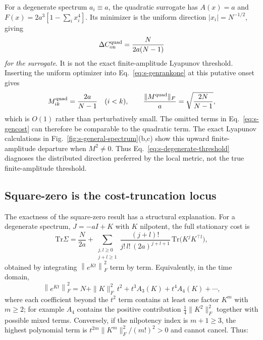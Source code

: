 \documentclass[
  aps,prl,preprint,notitlepage,superscriptaddress,nofootinbib,longbibliography,
  amsmath,amssymb
]{revtex4-2}
\newcommand{\Tr}{\mathrm{Tr}}
\newcommand{\frobnorm}[1]{\left\lVert #1\right\rVert_F}
\begin{document}
For a degenerate spectrum $a_i\equiv a$, the quadratic surrogate has
$A(x)=a$ and $F(x)=2a^3[1-\sum_i x_i^4]$.  Its minimizer is the uniform
direction $|x_i|=N^{-1/2}$, giving
\begin{equation}
\Delta C_{\rm on}^{\rm quad}=\frac{N}{2a(N-1)}
\label{eq:s-degenerate-threshold}
\end{equation}
\emph{for the surrogate}.  It is not the exact finite-amplitude Lyapunov
threshold.  Inserting the uniform optimizer into
Eq.~\eqref{eq:s-genrankone} at this putative onset gives
\begin{equation}
M_{ik}^{\rm quad}=\frac{2a}{N-1}\quad(i<k),\qquad
\frac{\|M^{\rm quad}\|_F}{a}=\sqrt{\frac{2N}{N-1}},
\label{eq:s-quad-norm}
\end{equation}
which is $O(1)$ rather than perturbatively small.  The omitted terms in
Eq.~\eqref{eq:s-gencost} can therefore be comparable to the quadratic term.
The exact Lyapunov calculations in Fig.~\ref{fig:s-general-spectrum}(b,c) show
this upward finite-amplitude departure when $M^2\neq0$.  Thus
Eq.~\eqref{eq:s-degenerate-threshold} diagnoses the distributed direction
preferred by the local metric, not the true finite-amplitude threshold.

\subsection{Square-zero is the cost-truncation locus}
\label{sec:s-truncation}

The exactness of the square-zero result has a structural explanation. For a
degenerate spectrum, $J=-aI+K$ with $K$ nilpotent, the full stationary cost is
\begin{equation}
\Tr\Sigma
=\frac{N}{2a}
+\sum_{\substack{j,l\ge0\\j+l\ge1}}
\frac{(j+l)!}{j!\,l!\,(2a)^{j+l+1}}
\,\Tr\!\big(K^{j}K^{\top l}\big),
\label{eq:s-fullcost}
\end{equation}
obtained by integrating $\frobnorm{e^{Kt}}^2$ term by term. Equivalently, in the
time domain,
\begin{equation}
\frobnorm{e^{Kt}}^2
=N+\|K\|_F^2\,t^2
+t^3 A_3(K)+t^4 A_4(K)+\cdots,
\label{eq:s-integrand}
\end{equation}
where each coefficient beyond the $t^2$ term contains at least one factor
$K^m$ with $m\ge2$; for example $A_4$ contains the positive contribution
$\tfrac14\|K^2\|_F^2$ together with possible mixed terms.  Conversely, if the
nilpotency index is $m+1\ge3$, the highest polynomial term is
$t^{2m}\|K^m\|_F^2/(m!)^2>0$ and cannot cancel. Thus:
\end{document}
